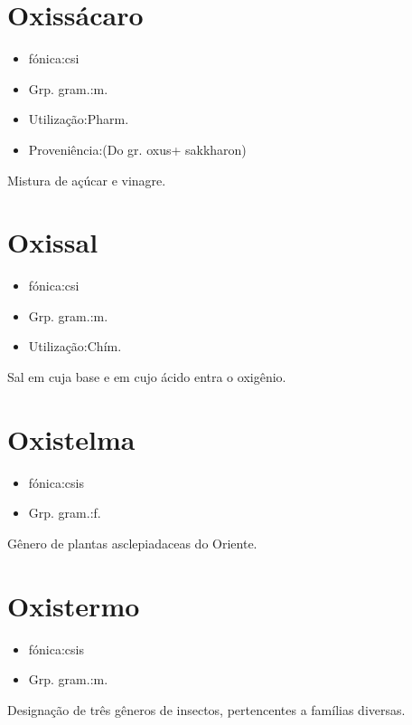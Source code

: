 \section{Oxissácaro}
\begin{itemize}
\item {fónica:csi}
\end{itemize}
\begin{itemize}
\item {Grp. gram.:m.}
\end{itemize}
\begin{itemize}
\item {Utilização:Pharm.}
\end{itemize}
\begin{itemize}
\item {Proveniência:(Do gr. \textunderscore oxus\textunderscore  + \textunderscore sakkharon\textunderscore )}
\end{itemize}
Mistura de açúcar e vinagre.
\section{Oxissal}
\begin{itemize}
\item {fónica:csi}
\end{itemize}
\begin{itemize}
\item {Grp. gram.:m.}
\end{itemize}
\begin{itemize}
\item {Utilização:Chím.}
\end{itemize}
Sal em cuja base e em cujo ácido entra o oxigênio.
\section{Oxistelma}
\begin{itemize}
\item {fónica:csis}
\end{itemize}
\begin{itemize}
\item {Grp. gram.:f.}
\end{itemize}
Gênero de plantas asclepiadaceas do Oriente.
\section{Oxistermo}
\begin{itemize}
\item {fónica:csis}
\end{itemize}
\begin{itemize}
\item {Grp. gram.:m.}
\end{itemize}
Designação de três gêneros de insectos, pertencentes a famílias diversas.
